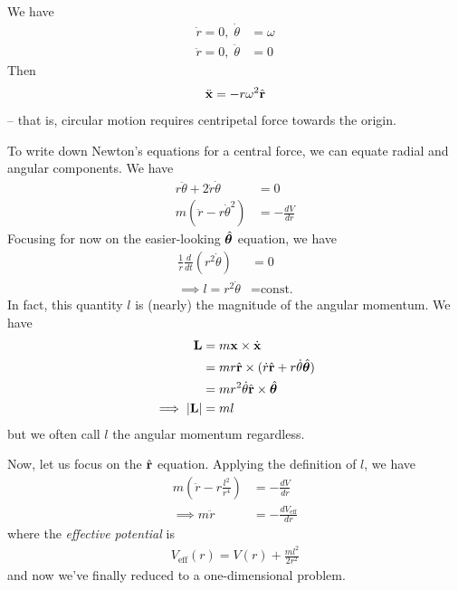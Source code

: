 \documentclass{../../template/note}
\begin{document}
    \begin{example}
        We have
        \begin{align*}
            \dot r = 0, \; \dot \theta &= \omega \\
            \ddot r = 0, \; \ddot \theta &= 0
        \end{align*}
        Then
        \begin{align*}
            \ddot{\V x} = -r\omega^2 \hvec r
        \end{align*}
        -- that is, circular motion requires centripetal force towards the origin.
    \end{example}
    
    To write down Newton's equations for a central force, we can equate radial and angular components. We have
    \begin{align*}
        r \ddot \theta + 2 \dot r \dot \theta &= 0 \\
        m\left(\ddot r - r \dot{\theta}^2\right) &= -\frac{dV}{dr}
    \end{align*}
    Focusing for now on the easier-looking \(\hvec \theta\) equation, we have
    \begin{align*}
        \frac 1 r \frac{d}{dt}(r^2 \dot \theta) &= 0 \\
        \implies l = r^2 \dot \theta &= \text{const.}
    \end{align*}
    In fact, this quantity \(l\) is (nearly) the magnitude of the angular momentum. We have
    \begin{align*}
        \V L &= m \V x \times \dot{\V x} \\
        &= mr \hvec r \times (\dot r \hvec r + r \dot \theta \hvec \theta) \\
        &= mr^2 \dot \theta \hvec r \times \hvec \theta \\
        \implies |\V L| &= ml
    \end{align*}
    but we often call \(l\) the angular momentum regardless.

    Now, let us focus on the \(\hvec r\) equation. Applying the definition of \(l\), we have
    \begin{align*}
        m\left(\ddot r - r\frac{l^2}{r^4}\right) &= -\frac{dV}{dr} \\
        \implies m \ddot r &= -\frac{dV_\text{eff}}{dr}
    \end{align*}
    where the \emph{effective potential} is
    \begin{align*}
        V_\text{eff}(r) = V(r) + \frac{ml^2}{2r^2}
    \end{align*}
    and now we've finally reduced to a one-dimensional problem.
\end{document}

